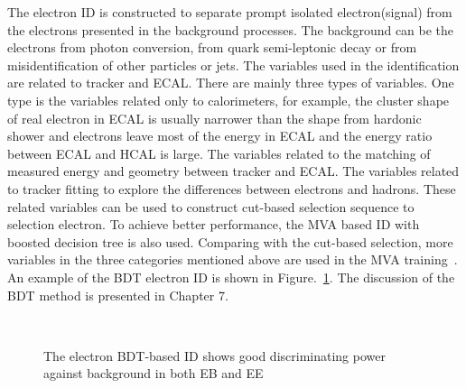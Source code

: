 The electron ID is constructed to separate prompt isolated electron(signal) from the electrons presented in the background processes. The background can be the electrons from photon conversion, from quark semi-leptonic decay or from misidentification of other particles or jets. The variables used in the identification are related to tracker and ECAL.  There are mainly three types of variables. One type is the variables related only to calorimeters, for example, the cluster shape of real electron in ECAL is usually narrower than the shape from hardonic shower and electrons leave most of the energy in ECAL and the energy ratio between ECAL and HCAL is large. The variables related to the matching of measured energy and geometry between tracker and ECAL. The variables related to tracker fitting to explore the differences between electrons and hadrons. These related variables can be used to construct cut-based selection sequence to selection electron. To achieve better performance, the MVA based ID with boosted decision tree is also used. Comparing with the cut-based selection, more variables in the three categories mentioned above are used in the MVA training~\cite{electron_reco2015}.  An example of the BDT electron ID is shown in Figure.~\ref{fig:eleBDTID}. The discussion of the BDT method is presented in Chapter 7.


\begin{figure}[!htbp] 
     \centering
     \\
     \caption{The electron BDT-based ID shows good discriminating power against background in both EB and EE~\cite{electron_reco2015}}
     \label{fig:eleBDTID}
\end{figure}


